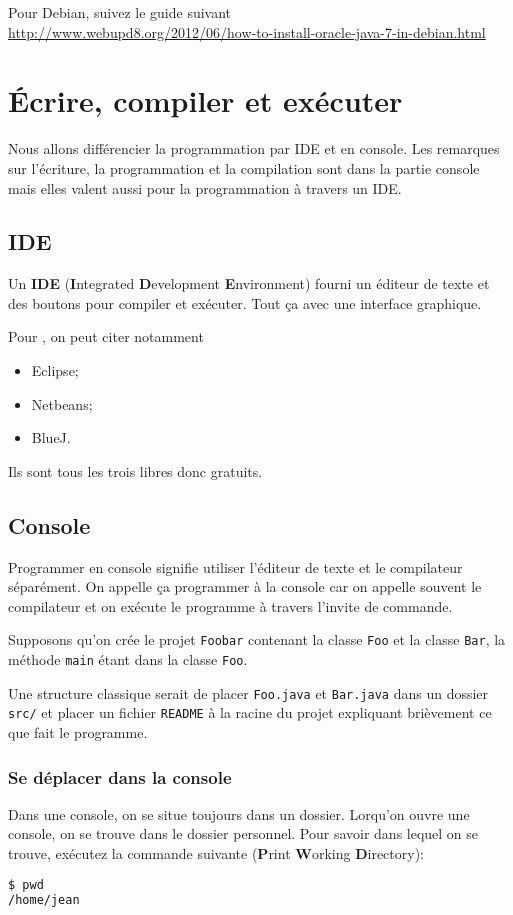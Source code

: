 Pour Debian, suivez le guide suivant\\
\url{http://www.webupd8.org/2012/06/how-to-install-oracle-java-7-in-debian.html}


\section{Écrire, compiler et exécuter}
Nous allons différencier la programmation par IDE et en console.
Les remarques sur l'écriture, la programmation et la compilation
sont dans la partie console mais elles valent aussi pour la
programmation à travers un IDE.

\subsection{IDE}
Un \textbf{IDE} (\textbf{I}ntegrated \textbf{D}evelopment \textbf{E}nvironment)
fourni un éditeur de texte et des boutons pour compiler et exécuter.
Tout ça avec une interface graphique.

Pour \java{}, on peut citer notamment
\begin{itemize}
  \item Eclipse;
  \item Netbeans;
  \item BlueJ.
\end{itemize}
Ils sont tous les trois libres donc gratuits.

\subsection{Console}
Programmer en console signifie utiliser
l'éditeur de texte et le compilateur séparément.
On appelle ça programmer à la console car on appelle souvent le compilateur
et on exécute le programme à travers l'invite de commande.

Supposons qu'on crée le projet \lstinline|Foobar| contenant la classe
\lstinline|Foo| et la classe \lstinline|Bar|,
la méthode \lstinline|main| étant dans la classe \lstinline|Foo|.

Une structure classique serait de placer
\lstinline|Foo.java| et \lstinline|Bar.java|
dans un dossier \lstinline|src/| et placer un fichier \lstinline|README|
à la racine du projet expliquant brièvement ce que fait le programme.

\subsubsection{Se déplacer dans la console}
Dans une console, on se situe toujours dans un dossier.
Lorqu'on ouvre une console, on se trouve dans le dossier personnel.
Pour savoir dans lequel on se trouve,
exécutez la commande suivante
(\textbf{P}rint \textbf{W}orking \textbf{D}irectory):
\begin{lstlisting}[language={sh}]
$ pwd
/home/jean
\end{lstlisting}

